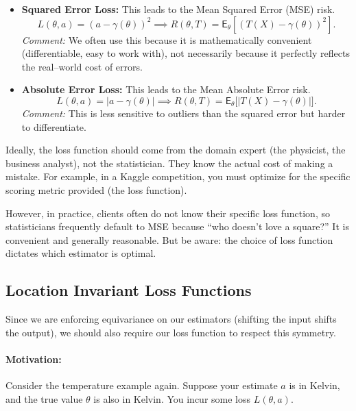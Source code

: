 \begin{ex}[]
\leavevmode
\begin{itemize}
\item \textbf{Squared Error Loss:} This leads to the Mean Squared Error (MSE) risk.
      \[ L(\theta, a) = (a - \gamma(\theta))^2 \implies R(\theta, T) = \mathsf{E}_{\theta} [(T(X) - \gamma(\theta))^2]. \]
      \textit{Comment:} We often use this because it is mathematically convenient (differentiable, easy to work with), not necessarily because it perfectly reflects the real--world cost of errors.
      
\item \textbf{Absolute Error Loss:} This leads to the Mean Absolute Error risk.
      \[ L(\theta, a) = |a - \gamma(\theta)| \implies R(\theta, T) = \mathsf{E}_{\theta} \big[ |T(X) - \gamma(\theta)| \big]. \]
      \textit{Comment:} This is less sensitive to outliers than the squared error but harder to differentiate.
\end{itemize}
\end{ex}

Ideally, the loss function should come from the domain expert (the physicist, the business analyst), not the statistician. They know the actual cost of making a mistake. For example, in a Kaggle competition, you must optimize for the specific scoring metric provided (the loss function). 

However, in practice, clients often do not know their specific loss function, so statisticians frequently default to MSE because ``who doesn't love a square?'' It is convenient and generally reasonable. But be aware: the choice of loss function dictates which estimator is optimal.

\subsection{Location Invariant Loss Functions}
\label{par:loc_inv_loss}

Since we are enforcing equivariance on our estimators (shifting the input shifts the output), we should also require our loss function to respect this symmetry.

\paragraph{Motivation:}%
\label{par:Motivation}
Consider the temperature example again. Suppose your estimate \(a\) is in Kelvin, and the true value \(\theta\) is also in Kelvin. You incur some loss \(L(\theta, a)\).

